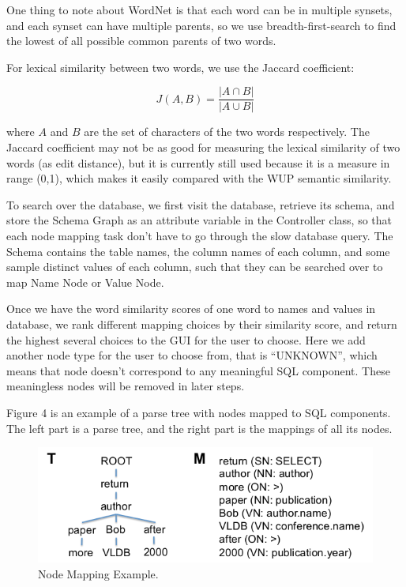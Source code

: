 \documentclass[twocolumn]{article}
\begin{document}
One thing to note about WordNet is that each word can be in multiple synsets, and each synset can have multiple parents, so we use breadth-first-search to find the lowest of all possible common parents of two words.


For lexical similarity between two words, we use the Jaccard coefficient:

$$ J(A, B) = \frac{|A \cap B|}{|A \cup B|}$$

where $A$ and $B$ are the set of characters of the two words respectively. The Jaccard coefficient may not be as good for measuring the lexical similarity of two words (as edit distance), but it is currently still used because it is a measure in range (0,1), which makes it easily compared with the WUP semantic similarity.

To search over the database, we first visit the database, retrieve its schema, and store the Schema Graph as an attribute variable in the Controller class, so that each node mapping task don’t have to go through the slow database query. The Schema contains the table names, the column names of each column, and some sample distinct values of each column, such that they can be searched over to map Name Node or Value Node.

Once we have the word similarity scores of one word to names and values in database, we rank different mapping choices by their similarity score, and return the highest several choices to the GUI for the user to choose. Here we add another node type for the user to choose from, that is “UNKNOWN”, which means that node doesn’t correspond to any meaningful SQL component. These meaningless nodes will be removed in later steps.

Figure 4 is an example of a parse tree with nodes mapped to SQL components. The left part is a parse tree, and the right part is the mappings of all its nodes.

\begin{figure}[ht]
  \centering
  \includegraphics[width=0.9\linewidth]{figures/nodes_mapping_example.png}
  \caption[caption for nodes mapping example]{Node Mapping Example.\protect\footnotemark }
\end{figure}
\end{document}
